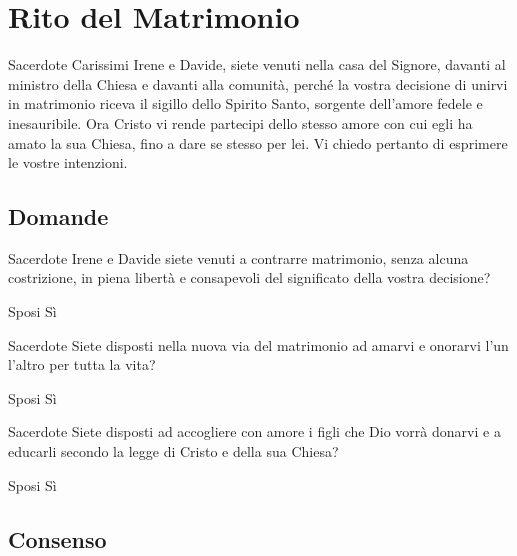 
\section*{Rito del Matrimonio}

\begin{dialoghi}
\item[Sacerdote] Carissimi Irene e Davide, siete venuti nella casa del Signore, davanti al ministro della Chiesa e davanti alla comunità, perché la vostra decisione di unirvi in matrimonio riceva il sigillo dello Spirito Santo, sorgente dell'amore fedele e inesauribile. Ora Cristo vi rende partecipi dello stesso amore con cui egli ha amato la sua Chiesa, fino a dare se stesso per lei. Vi chiedo pertanto di esprimere le vostre intenzioni.
\end{dialoghi}

\subsection*{Domande}

\begin{dialoghi}
\item[Sacerdote] Irene e Davide siete venuti a contrarre matrimonio, senza alcuna costrizione, in piena libertà e consapevoli del significato della vostra decisione?
\item[Sposi] Sì
\item[Sacerdote] Siete disposti nella nuova via del matrimonio ad amarvi e onorarvi l'un l'altro per tutta la vita?
\item[Sposi] Sì
\item[Sacerdote] Siete disposti ad accogliere con amore i figli che Dio vorrà donarvi e a educarli secondo la legge di Cristo e della sua Chiesa?
\item[Sposi] Sì
\end{dialoghi}

\subsection*{Consenso}

